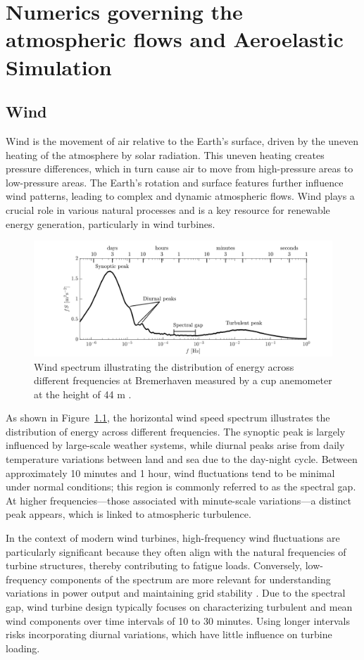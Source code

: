 \chapter{Numerics governing the atmospheric flows and Aeroelastic Simulation} \label{cha:NUM}
\section{Wind}
Wind is the movement of air relative to the Earth's surface, driven by the uneven heating of the atmosphere by solar radiation. This uneven heating creates pressure differences, which in turn cause air to move from high-pressure areas to low-pressure areas. The Earth's rotation and surface features further influence wind patterns, leading to complex and dynamic atmospheric flows. Wind plays a crucial role in various natural processes and is a key resource for renewable energy generation, particularly in wind turbines. 

\begin{figure}[ht]
    \centering
    \includegraphics[width=\textwidth]{Figures/WindSpectra.png}
    \caption{Wind spectrum illustrating the distribution of energy across different frequencies at Bremerhaven measured by a cup anemometer
    at the height of 44 m \cite{Rettenmeier2013}.}
    \label{fig:windspectrum}
\end{figure}
As shown in Figure~\ref{fig:windspectrum}, the horizontal wind speed spectrum illustrates the distribution of energy across different frequencies. The synoptic peak is largely influenced by large-scale weather systems, while diurnal peaks arise from daily temperature variations between land and sea due to the day-night cycle. Between approximately 10 minutes and 1 hour, wind fluctuations tend to be minimal under normal conditions; this region is commonly referred to as the spectral gap. At higher frequencies—those associated with minute-scale variations—a distinct peak appears, which is linked to atmospheric turbulence.

In the context of modern wind turbines, high-frequency wind fluctuations are particularly significant because they often align with the natural frequencies of turbine structures, thereby contributing to fatigue loads. Conversely, low-frequency components of the spectrum are more relevant for understanding variations in power output and maintaining grid stability \cite{kosovic2025}. Due to the spectral gap, wind turbine design typically focuses on characterizing turbulent and mean wind components over time intervals of 10 to 30 minutes. Using longer intervals risks incorporating diurnal variations, which have little influence on turbine loading.

